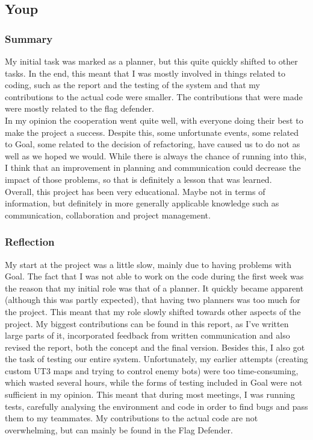 \subsection{Youp}
\subsubsection{Summary}
My initial task was marked as a planner, but this quite quickly shifted to other tasks. In the end, this meant that I was mostly involved in things related to coding, such as the report and the testing of the system and that my contributions to the actual code were smaller. The contributions that were made were mostly related to the flag defender.\\

In my opinion the cooperation went quite well, with everyone doing their best to make the project a success. Despite this, some unfortunate events, some related to Goal, some related to the decision of refactoring, have caused us to do not as well as we hoped we would. While there is always the chance of running into this, I think that an improvement in planning and communication could decrease the impact of those problems, so that is definitely a lesson that was learned.\\

Overall, this project has been very educational. Maybe not in terms of information, but definitely in more generally applicable knowledge such as communication, collaboration and project management. 

\subsubsection{Reflection}
My start at the project was a little slow, mainly due to having problems with Goal. The fact that I was not able to work on the code during the first week was the reason that my initial role was that of a planner. It quickly became apparent (although this was partly expected), that having two planners was too much for the project. This meant that my role slowly shifted towards other aspects of the project. My biggest contributions can be found in this report, as I've written large parts of it, incorporated feedback from written communication and also revised the report, both the concept and the final version. Besides this, I also got the task of testing our entire system. Unfortunately, my earlier attempts (creating custom UT3 maps and trying to control enemy bots) were too time-consuming, which wasted several hours, while the forms of testing included in Goal were not sufficient in my opinion. This meant that during most meetings, I was running tests, carefully analysing the environment and code in order to find bugs and pass them to my teammates. My contributions to the actual code are not overwhelming, but can mainly be found in the Flag Defender.\\

